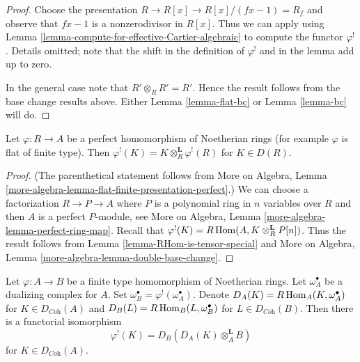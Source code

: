 \begin{proof}
Choose the presentation $R \to R[x] \to R[x]/(fx - 1) = R_f$ and observe
that $fx - 1$ is a nonzerodivisor in $R[x]$. Thus we can apply
using Lemma \ref{lemma-compute-for-effective-Cartier-algebraic}
to compute the functor $\varphi^!$. Details omitted;
note that the shift in the definition
of $\varphi^!$ and in the lemma add up to zero.

\medskip\noindent
In the general case note that $R' \otimes_R R' = R'$.
Hence the result follows from the base change results
above. Either Lemma \ref{lemma-flat-bc} or
Lemma \ref{lemma-bc} will do.
\end{proof}

\begin{lemma}
\label{lemma-upper-shriek-is-tensor-functor}
Let $\varphi : R \to A$ be a perfect homomorphism of Noetherian rings
(for example $\varphi$ is flat of finite type).
Then $\varphi^!(K) = K \otimes_R^\mathbf{L} \varphi^!(R)$
for $K \in D(R)$.
\end{lemma}

\begin{proof}
(The parenthetical statement follows from
More on Algebra, Lemma
\ref{more-algebra-lemma-flat-finite-presentation-perfect}.)
We can choose a factorization $R \to P \to A$ where $P$ is a polynomial
ring in $n$ variables over $R$ and then $A$ is a perfect $P$-module, see
More on Algebra, Lemma \ref{more-algebra-lemma-perfect-ring-map}.
Recall that $\varphi^!(K) = R\mathop{\mathrm{Hom}}\nolimits(A, K \otimes_R^\mathbf{L} P[n])$.
Thus the result follows from
Lemma \ref{lemma-RHom-is-tensor-special}
and More on Algebra, Lemma \ref{more-algebra-lemma-double-base-change}.
\end{proof}

\begin{lemma}
\label{lemma-relative-dualizing-if-have-omega}
Let $\varphi : A \to B$ be a finite type homomorphism of Noetherian rings.
Let $\omega_A^\bullet$ be a dualizing complex for $A$. Set
$\omega_B^\bullet = \varphi^!(\omega_A^\bullet)$. Denote
$D_A(K) = R\mathop{\mathrm{Hom}}\nolimits_A(K, \omega_A^\bullet)$ for $K \in D_{\textit{Coh}}(A)$
and
$D_B(L) = R\mathop{\mathrm{Hom}}\nolimits_B(L, \omega_B^\bullet)$ for $L \in D_{\textit{Coh}}(B)$.
Then there is a functorial isomorphism
$$
\varphi^!(K) = D_B(D_A(K) \otimes_A^\mathbf{L} B)
$$
for $K \in D_{\textit{Coh}}(A)$.
\end{lemma}

